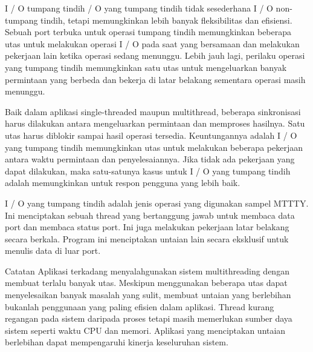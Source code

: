 		\begin{enumerate}
		I / O tumpang tindih
				/ O yang tumpang tindih tidak sesederhana I / O non-tumpang tindih, tetapi memungkinkan lebih banyak fleksibilitas dan efisiensi. Sebuah port terbuka untuk operasi tumpang tindih memungkinkan beberapa utas untuk melakukan operasi I / O pada saat yang bersamaan dan melakukan pekerjaan lain ketika operasi sedang menunggu. Lebih jauh lagi, perilaku operasi yang tumpang tindih memungkinkan satu utas untuk mengeluarkan banyak permintaan yang berbeda dan bekerja di latar belakang sementara operasi masih menunggu.

				Baik dalam aplikasi single-threaded maupun multithread, beberapa sinkronisasi harus dilakukan antara mengeluarkan permintaan dan memproses hasilnya. Satu utas harus diblokir sampai hasil operasi tersedia. Keuntungannya adalah I / O yang tumpang tindih memungkinkan utas untuk melakukan beberapa pekerjaan antara waktu permintaan dan penyelesaiannya. Jika tidak ada pekerjaan yang dapat dilakukan, maka satu-satunya kasus untuk I / O yang tumpang tindih adalah memungkinkan untuk respon pengguna yang lebih baik.

				I / O yang tumpang tindih adalah jenis operasi yang digunakan sampel MTTTY. Ini menciptakan sebuah thread yang bertanggung jawab untuk membaca data port dan membaca status port. Ini juga melakukan pekerjaan latar belakang secara berkala. Program ini menciptakan untaian lain secara eksklusif untuk menulis data di luar port.
				
				Catatan Aplikasi terkadang menyalahgunakan sistem multithreading dengan membuat terlalu banyak utas. Meskipun menggunakan beberapa utas dapat menyelesaikan banyak masalah yang sulit, membuat untaian yang berlebihan bukanlah penggunaan yang paling efisien dalam aplikasi. Thread kurang regangan pada sistem daripada proses tetapi masih memerlukan sumber daya sistem seperti waktu CPU dan memori. Aplikasi yang menciptakan untaian berlebihan dapat mempengaruhi kinerja keseluruhan sistem.

		\end{enumerate}

